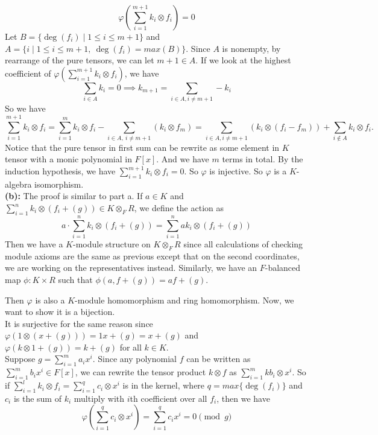 \documentclass[12pt]{amsart}
\begin{document}
\[\varphi(\sum_{i=1}^{m+1}k_i\otimes f_i)=0\]
Let $B=\{\deg(f_i)\mid 1\leq i\leq m+1\}$ and $A=\{i\mid 1\leq i\leq m+1,\ \deg(f_i)=max(B)\}$. Since $A$ is nonempty, by rearrange of the pure tensors, we can let $m+1\in A$. If we look at the highest coefficient of $\varphi(\sum_{i=1}^{m+1}k_i\otimes f_i)$, we have 
\[\sum_{i\in A}k_i=0\implies k_{m+1}=\sum_{i\in A,i\neq m+1}-k_i\]
So we have
\[\sum_{i=1}^{m+1}k_i\otimes f_i=\sum_{i=1}^{m}k_i\otimes f_i-\sum_{i\in A,\ i\neq m+1}(k_i\otimes f_m)=\sum_{i\in A,i\neq m+1}(k_i\otimes (f_i-f_m))+\sum_{i\notin A}k_i\otimes f_i.\]
Notice that the pure tensor in first sum can be rewrite as some element in $K$ tensor with a monic polynomial in $F[x]$. And we have $m$ terms in total. By the induction hypothesis, we have $\sum_{i=1}^{m+1}k_i\otimes f_i=0$. So $\varphi$ is injective. So $\varphi$ is a $K$-algebra isomorphism.\\
\textbf{(b):} The proof is similar to part a. If $a\in K$ and $\sum_{i=1}^nk_i\otimes (f_i+(g))\in K\otimes_F R$, we define the action as 
\[a\cdot \sum_{i=1}^nk_i\otimes (f_i+(g))=\sum_{i=1}^nak_i\otimes (f_i+(g))\]
Then we have a $K$-module structure on $K\otimes_F R$ since all calculations of checking module axioms are the same as previous except that on the second coordinates, we are working on the representatives instead. Similarly, we have an $F$-balanced map $\phi:K\times R$ such that $\phi(a,f+(g))=af+(g)$. 
\begin{center}
\end{center}
Then $\varphi$ is also a $K$-module homomorphism and ring homomorphism. Now, we want to show it is a bijection.\\
It is surjective for the same reason since $\varphi(1\otimes (x+(g)))=1x+(g)=x+(g)$ and $\varphi(k\otimes 1+(g))=k+(g)$ for all $k\in K$.\\
Suppose $g=\sum_{i=1}^ma_ix^i$. Since any polynomial $f$ can be written as $\sum_{i=1}^mb_ix^i\in F[x]$, we can rewrite the tensor product $k\otimes f$ as $\sum_{i=1}^mkb_i\otimes x^i$. So if $\sum_{i=1}^l k_i\otimes f_i=\sum_{i=1}^q c_i\otimes x^i$ is in the kernel, where $q=max\{\deg(f_i)\}$ and $c_i$ is the sum of $k_i$ multiply with $i$th coefficient over all $f_i$, then we have 
\[\varphi(\sum_{i=1}^qc_i\otimes x^i)=\sum_{i=1}^qc_ix^i=0\pmod g\]
\end{document}
